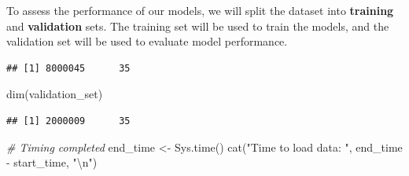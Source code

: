 \documentclass[
]{article}
\newenvironment{Shaded}{}{}
\newcommand{\AttributeTok}[1]{\textcolor[rgb]{0.49,0.56,0.16}{#1}}
\newcommand{\CommentTok}[1]{\textcolor[rgb]{0.38,0.63,0.69}{\textit{#1}}}
\newcommand{\ConstantTok}[1]{\textcolor[rgb]{0.53,0.00,0.00}{#1}}
\newcommand{\DecValTok}[1]{\textcolor[rgb]{0.25,0.63,0.44}{#1}}
\newcommand{\FloatTok}[1]{\textcolor[rgb]{0.25,0.63,0.44}{#1}}
\newcommand{\FunctionTok}[1]{\textcolor[rgb]{0.02,0.16,0.49}{#1}}
\newcommand{\NormalTok}[1]{#1}
\newcommand{\OtherTok}[1]{\textcolor[rgb]{0.00,0.44,0.13}{#1}}
\newcommand{\SpecialCharTok}[1]{\textcolor[rgb]{0.25,0.44,0.63}{#1}}
\newcommand{\StringTok}[1]{\textcolor[rgb]{0.25,0.44,0.63}{#1}}
\begin{document}
To assess the performance of our models, we will split the dataset into
\textbf{training} and \textbf{validation} sets. The training set will be
used to train the models, and the validation set will be used to
evaluate model performance.

\begin{Shaded}
\end{Shaded}

\begin{verbatim}
## [1] 8000045      35
\end{verbatim}

\begin{Shaded}
\begin{Highlighting}[]
\FunctionTok{dim}\NormalTok{(validation\_set)}
\end{Highlighting}
\end{Shaded}

\begin{verbatim}
## [1] 2000009      35
\end{verbatim}

\begin{Shaded}
\begin{Highlighting}[]
\CommentTok{\# Timing completed}
\NormalTok{end\_time }\OtherTok{\textless{}{-}} \FunctionTok{Sys.time}\NormalTok{()}
\FunctionTok{cat}\NormalTok{(}\StringTok{"Time to load data: "}\NormalTok{, end\_time }\SpecialCharTok{{-}}\NormalTok{ start\_time, }\StringTok{"}\SpecialCharTok{\textbackslash{}n}\StringTok{"}\NormalTok{)}
\end{Highlighting}
\end{Shaded}
\end{document}
